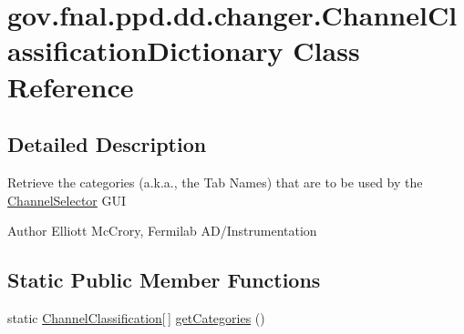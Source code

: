 \hypertarget{classgov_1_1fnal_1_1ppd_1_1dd_1_1changer_1_1ChannelClassificationDictionary}{\section{gov.\-fnal.\-ppd.\-dd.\-changer.\-Channel\-Classification\-Dictionary Class Reference}
\label{classgov_1_1fnal_1_1ppd_1_1dd_1_1changer_1_1ChannelClassificationDictionary}
}


\subsection{Detailed Description}
Retrieve the categories (a.\-k.\-a., the Tab Names) that are to be used by the \hyperlink{classgov_1_1fnal_1_1ppd_1_1dd_1_1ChannelSelector}{Channel\-Selector} G\-U\-I

\begin{DoxyAuthor}{Author}
Elliott Mc\-Crory, Fermilab A\-D/\-Instrumentation 
\end{DoxyAuthor}
\subsection*{Static Public Member Functions}
\begin{DoxyCompactItemize}
\item 
static \hyperlink{classgov_1_1fnal_1_1ppd_1_1dd_1_1changer_1_1ChannelClassification}{Channel\-Classification}\mbox{[}$\,$\mbox{]} \hyperlink{classgov_1_1fnal_1_1ppd_1_1dd_1_1changer_1_1ChannelClassificationDictionary_a586c766b8a6072e727bdae5d5d8c8b63}{get\-Categories} ()
\end{DoxyCompactItemize}



